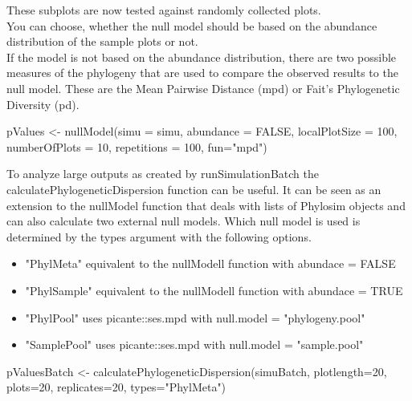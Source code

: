 \documentclass [a4paper]{tufte-book}\usepackage[]{graphicx}\usepackage[]{color}
\begin{document}
These subplots are now tested against randomly collected plots.\\
You can choose, whether the null model should be based on the abundance distribution of the sample plots or not.\\
If the model is not based on the abundance distribution, there are two possible measures of the phylogeny that are used to compare the observed results to the null model. These are the Mean Pairwise Distance (mpd) or Fait's Phylogenetic Diversity (pd).

\begin{Schunk}
\begin{Sinput}
pValues <- nullModel(simu = simu, abundance = FALSE, localPlotSize = 100, numberOfPlots = 10, repetitions = 100, fun="mpd")
\end{Sinput}
\end{Schunk}

To analyze large outputs as created by runSimulationBatch the calculatePhylogeneticDispersion function can be useful. It can be seen as an extension to the nullModel function that deals with lists of Phylosim objects and can also calculate two external null models. Which null model is used is determined by the types argument with the following options.
\begin{itemize}
\item "PhylMeta" equivalent to the nullModell function with abundace = FALSE
\item "PhylSample"  equivalent to the nullModell function with abundace = TRUE
\item "PhylPool" uses picante::ses.mpd with null.model = "phylogeny.pool"
\item "SamplePool" uses picante::ses.mpd with null.model = "sample.pool"
\end{itemize}

\begin{Schunk}
\begin{Sinput}
pValuesBatch <- calculatePhylogeneticDispersion(simuBatch, plotlength=20, plots=20, replicates=20, types="PhylMeta")
\end{Sinput}
\end{Schunk}

\newpage

 


\end{document}
